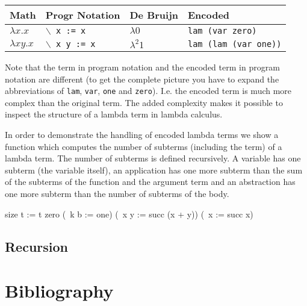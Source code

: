 \documentclass[12pt]{article}
\begin{document}
\begin{tabular}[t]{|l|l|l|l|}
    \hline
    Math
    & Progr Notation
    & De Bruijn
    & Encoded
    \\
    \hline
    $\lambda x. x$
    & {\tt $\backslash$ x := x}
    & $\lambda 0$
    & {\tt lam (var zero)}
    \\
    \hline
    $\lambda x y. x$
    & {\tt $\backslash$ x y := x}
    & $\lambda^2 1$
    & {\tt lam (lam (var one))}
    \\
    \hline
\end{tabular}

Note that the term in program notation and the encoded term in program notation
are different (to get the complete picture you have to expand the abbreviations
of {\tt lam}, {\tt var}, {\tt one} and {\tt zero}). I.e. the encoded term is
much more complex than the original term. The added complexity makes it possible
to inspect the structure of a lambda term in lambda calculus.


In order to demonstrate the handling of encoded lambda terms we show a function
which computes the number of subterms (including the term) of a lambda term.
The number of subterms is defined recursively. A variable has one subterm (the
variable itself), an application has one more subterm than the sum of the
subterms of the function and the argument term and an abstraction has one more
subterm than the number of subterms of the body.


\begin{lam}
    size t :=
        t
            zero
            (\ k b := one)
            (\ x y := succ (x + y))
            (\ x := succ x)
\end{lam}






\subsection{Recursion}



\section{Bibliography}


{}

\end{document}
